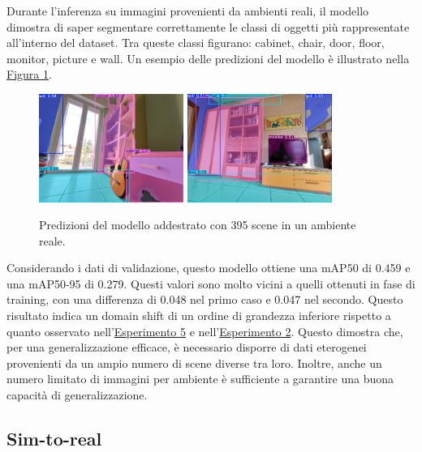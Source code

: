 \documentclass[12pt]{report}
\begin{document}
Durante l'inferenza su immagini provenienti da ambienti reali, il modello dimostra di saper segmentare correttamente le classi di oggetti più rappresentate all'interno del dataset. Tra queste classi figurano: cabinet, chair, door, floor, monitor, picture e wall. Un esempio delle predizioni del modello è illustrato nella \hyperref[fig:prediciton-3]{Figura \ref{fig:prediciton-3}}.

\begin{figure}[h!]
	\centering
	{\includegraphics[width=0.42\textwidth]{images/domain-shift/real-to-real/6/prediction-1.jpg}}
	\hspace{0.01\textwidth}
	{\includegraphics[width=0.42\textwidth]{images/domain-shift/real-to-real/6/prediction-2.jpg}}
	\caption{Predizioni del modello addestrato con 395 scene in un ambiente reale.}
	\label{fig:prediciton-3}
\end{figure}

Considerando i dati di validazione, questo modello ottiene una mAP50 di 0.459 e una mAP50-95 di 0.279. Questi valori sono molto vicini a quelli ottenuti in fase di training, con una differenza di 0.048 nel primo caso e 0.047 nel secondo. Questo risultato indica un domain shift di un ordine di grandezza inferiore rispetto a quanto osservato nell'\hyperref[sec:esperimento_5]{Esperimento 5} e nell'\hyperref[sec:esperimento_2]{Esperimento 2}. Questo dimostra che, per una generalizzazione efficace, è necessario disporre di dati eterogenei provenienti da un ampio numero di scene diverse tra loro. Inoltre, anche un numero limitato di immagini per ambiente è sufficiente a garantire una buona capacità di generalizzazione.

\subsection{Sim-to-real}
\label{sec:sim_to_real}
\end{document}
